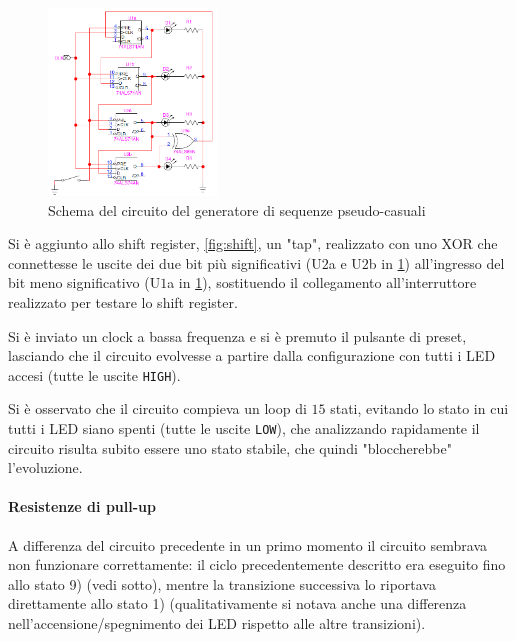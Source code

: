 \documentclass[a4paper,10pt]{article}
\def\code#1{\texttt{#1}}
\begin{document}
\begin{figure}
	\vspace{-5pt}
	\centering
	\includegraphics[width=0.4\textwidth]{../grafici/randomseq.png}
	\vspace{-5pt}
	\caption{Schema del circuito del generatore di sequenze pseudo-casuali}
	\label{fig:random}
	\vspace{-5pt}
\end{figure}

Si è aggiunto allo shift register, \cref{fig:shift}, un "tap", realizzato con uno XOR che connettesse le uscite dei due bit più significativi (U$2$a e U$2$b in \cref{fig:random}) all'ingresso del bit meno significativo (U$1$a in \cref{fig:random}), sostituendo il collegamento all'interruttore realizzato per testare lo shift register.
\newline

Si è inviato un clock a bassa frequenza e si è premuto il pulsante di preset, lasciando che il circuito evolvesse a partire dalla configurazione con tutti i LED accesi (tutte le uscite \code{HIGH}).

Si è osservato che il circuito compieva un loop di $15$ stati, evitando lo stato in cui tutti i LED siano spenti (tutte le uscite \code{LOW}), che analizzando rapidamente il circuito risulta subito essere uno stato stabile, che quindi "bloccherebbe" l'evoluzione.

\paragraph{Resistenze di pull-up}A differenza del circuito precedente in un primo momento il circuito sembrava non funzionare correttamente: il ciclo precedentemente descritto era eseguito fino allo stato 9) (vedi sotto), mentre la transizione successiva lo riportava direttamente allo stato 1) (qualitativamente si notava anche una differenza nell'accensione/spegnimento dei LED rispetto alle altre transizioni).
\end{document}
